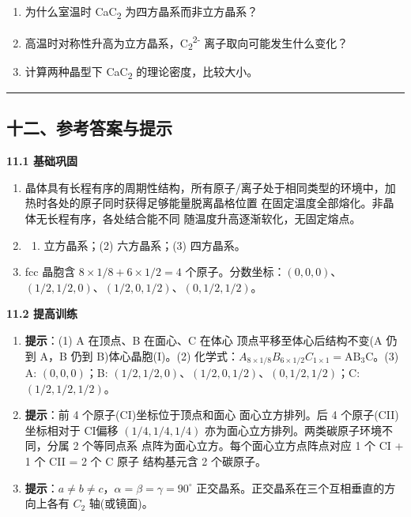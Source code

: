 \begin{enumerate}
  \begin{enumerate}
  \def\labelenumii{(\arabic{enumii})}
  \tightlist
  \item
    为什么室温时 CaC\textsubscript{2} 为四方晶系而非立方晶系？
  \item
    高温时对称性升高为立方晶系，C\textsubscript{2}\textsuperscript{2-} 离子取向可能发生什么变化？
  \item
    计算两种晶型下 CaC\textsubscript{2} 的理论密度，比较大小。
  \end{enumerate}
\end{enumerate}

\begin{center}\rule{0.5\linewidth}{0.5pt}\end{center}

\subsection{十二、参考答案与提示}\label{ux5341ux4e8cux53c2ux8003ux7b54ux6848ux4e0eux63d0ux793a}

\textbf{11.1 基础巩固}

\begin{enumerate}
\def\labelenumi{\arabic{enumi}.}
\item
  晶体具有长程有序的周期性结构，所有原子/离子处于相同类型的环境中，加热时各处的原子同时获得足够能量脱离晶格位置 \箭 在固定温度全部熔化。非晶体无长程有序，各处结合能不同 \箭 随温度升高逐渐软化，无固定熔点。
\item
  \begin{enumerate}
  \def\labelenumii{(\arabic{enumii})}
  \tightlist
  \item
    立方晶系；(2) 六方晶系；(3) 四方晶系。
  \end{enumerate}
\item
  fcc 晶胞含 \(8 \times 1/8 + 6 \times 1/2 = 4\) 个原子。分数坐标：\((0, 0, 0)\)、\((1/2, 1/2, 0)\)、\((1/2, 0, 1/2)\)、\((0, 1/2, 1/2)\)。
\end{enumerate}

\textbf{11.2 提高训练}

\begin{enumerate}
\def\labelenumi{\arabic{enumi}.}
\setcounter{enumi}{3}
\item
  \textbf{提示}：(1) A 在顶点、B 在面心、C 在体心 \箭 顶点平移至体心后结构不变(A 仍到 A，B 仍到 B)\箭 体心晶胞(I)。(2) 化学式：\(A_{8\times 1/8} B_{6\times 1/2} C_{1\times 1} = \mathrm{AB_3C}\)。(3) A: \((0,0,0)\)；B: \((1/2,1/2,0)\)、\((1/2,0,1/2)\)、\((0,1/2,1/2)\)；C: \((1/2,1/2,1/2)\)。
\item
  \textbf{提示}：前 4 个原子(CI)坐标位于顶点和面心 \箭 面心立方排列。后 4 个原子(CII)坐标相对于 CI偏移 \((1/4, 1/4, 1/4)\) \箭 亦为面心立方排列。两类碳原子环境不同，分属 2 个等同点系 \箭 点阵为面心立方。每个面心立方点阵点对应 1 个 CI + 1 个 CII = 2 个 C 原子 \箭 结构基元含 2 个碳原子。
\item
  \textbf{提示}：\(a \neq b \neq c\)，\(\alpha = \beta = \gamma = 90^\circ\) \箭 正交晶系。正交晶系在三个互相垂直的方向上各有 \(C_2\) 轴(或镜面)。
\end{enumerate}

